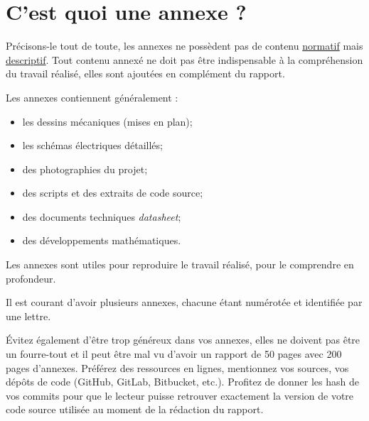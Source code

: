 \chapter{C'est quoi une annexe ?}

Précisons-le tout de toute, les annexes ne possèdent pas de contenu \underline{normatif} mais \underline{descriptif}. Tout contenu annexé ne doit pas être indispensable à la compréhension du travail réalisé, elles sont ajoutées en complément du rapport.

Les annexes contiennent généralement :

\begin{itemize}
    \item les dessins mécaniques (mises en plan);
    \item les schémas électriques détaillés;
    \item des photographies du projet;
    \item des scripts et des extraits de code source;
    \item des documents techniques \pex \emph{datasheet};
    \item des développements mathématiques.
\end{itemize}

Les annexes sont utiles pour reproduire le travail réalisé, pour le comprendre en profondeur.

Il est courant d'avoir plusieurs annexes, chacune étant numérotée et identifiée par une lettre.

Évitez également d'être trop généreux dans vos annexes, elles ne doivent pas être un fourre-tout et il peut être mal vu d'avoir un rapport de 50 pages avec 200 pages d'annexes. Préférez des ressources en lignes, mentionnez vos sources, vos dépôts de code (GitHub, GitLab, Bitbucket, etc.). Profitez de donner les hash de vos commits pour que le lecteur puisse retrouver exactement la version de votre code source utilisée au moment de la rédaction du rapport.